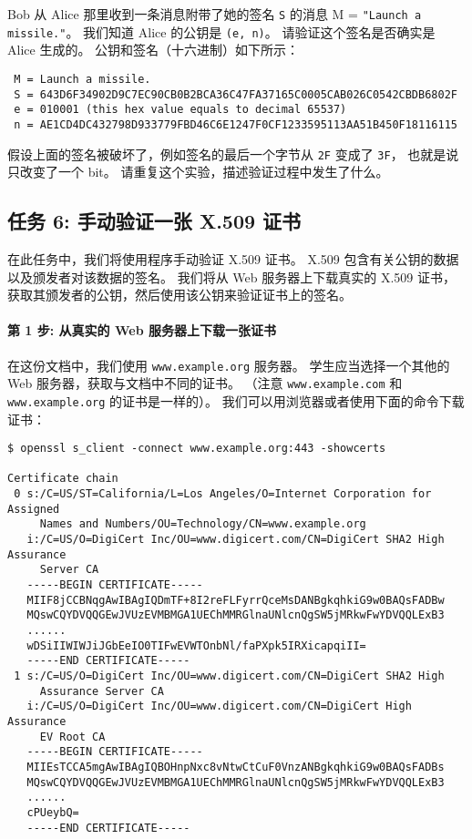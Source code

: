 Bob 从 Alice 那里收到一条消息附带了她的签名 \texttt{S} 的消息
M = \texttt{"Launch a missile."}。
我们知道 Alice 的公钥是 \texttt{(e, n)}。
请验证这个签名是否确实是 Alice 生成的。
公钥和签名（十六进制）如下所示：

\begin{lstlisting}
 M = Launch a missile.
 S = 643D6F34902D9C7EC90CB0B2BCA36C47FA37165C0005CAB026C0542CBDB6802F
 e = 010001 (this hex value equals to decimal 65537)
 n = AE1CD4DC432798D933779FBD46C6E1247F0CF1233595113AA51B450F18116115
\end{lstlisting}


假设上面的签名被破坏了，例如签名的最后一个字节从 \texttt{2F} 变成了 \texttt{3F}，
也就是说只改变了一个 bit。
请重复这个实验，描述验证过程中发生了什么。


\subsection{任务 6: 手动验证一张 X.509 证书}

在此任务中，我们将使用程序手动验证 X.509 证书。
X.509 包含有关公钥的数据以及颁发者对该数据的签名。
我们将从 Web 服务器上下载真实的 X.509 证书，获取其颁发者的公钥，然后使用该公钥来验证证书上的签名。

\paragraph{第 1 步: 从真实的 Web 服务器上下载一张证书}
在这份文档中，我们使用 \texttt{www.example.org} 服务器。
学生应当选择一个其他的 Web 服务器，获取与文档中不同的证书。
（注意 \texttt{www.example.com} 和 \texttt{www.example.org} 的证书是一样的）。
我们可以用浏览器或者使用下面的命令下载证书：

\begin{lstlisting}
$ openssl s_client -connect www.example.org:443 -showcerts

Certificate chain
 0 s:/C=US/ST=California/L=Los Angeles/O=Internet Corporation for Assigned
     Names and Numbers/OU=Technology/CN=www.example.org
   i:/C=US/O=DigiCert Inc/OU=www.digicert.com/CN=DigiCert SHA2 High Assurance
     Server CA
   -----BEGIN CERTIFICATE-----
   MIIF8jCCBNqgAwIBAgIQDmTF+8I2reFLFyrrQceMsDANBgkqhkiG9w0BAQsFADBw
   MQswCQYDVQQGEwJVUzEVMBMGA1UEChMMRGlnaUNlcnQgSW5jMRkwFwYDVQQLExB3
   ......
   wDSiIIWIWJiJGbEeIO0TIFwEVWTOnbNl/faPXpk5IRXicapqiII=
   -----END CERTIFICATE-----
 1 s:/C=US/O=DigiCert Inc/OU=www.digicert.com/CN=DigiCert SHA2 High
     Assurance Server CA
   i:/C=US/O=DigiCert Inc/OU=www.digicert.com/CN=DigiCert High Assurance
     EV Root CA
   -----BEGIN CERTIFICATE-----
   MIIEsTCCA5mgAwIBAgIQBOHnpNxc8vNtwCtCuF0VnzANBgkqhkiG9w0BAQsFADBs
   MQswCQYDVQQGEwJVUzEVMBMGA1UEChMMRGlnaUNlcnQgSW5jMRkwFwYDVQQLExB3
   ......
   cPUeybQ=
   -----END CERTIFICATE-----
\end{lstlisting}

